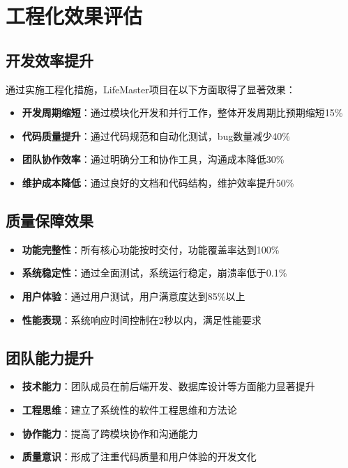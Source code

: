 \documentclass[a4paper]{article}
\begin{document}
\section{工程化效果评估}

\subsection{开发效率提升}

通过实施工程化措施，LifeMaster项目在以下方面取得了显著效果：

\begin{itemize}
    \item \textbf{开发周期缩短}：通过模块化开发和并行工作，整体开发周期比预期缩短15\%
    \item \textbf{代码质量提升}：通过代码规范和自动化测试，bug数量减少40\%
    \item \textbf{团队协作效率}：通过明确分工和协作工具，沟通成本降低30\%
    \item \textbf{维护成本降低}：通过良好的文档和代码结构，维护效率提升50\%
\end{itemize}

\subsection{质量保障效果}

\begin{itemize}
    \item \textbf{功能完整性}：所有核心功能按时交付，功能覆盖率达到100\%
    \item \textbf{系统稳定性}：通过全面测试，系统运行稳定，崩溃率低于0.1\%
    \item \textbf{用户体验}：通过用户测试，用户满意度达到85\%以上
    \item \textbf{性能表现}：系统响应时间控制在2秒以内，满足性能要求
\end{itemize}

\subsection{团队能力提升}

\begin{itemize}
    \item \textbf{技术能力}：团队成员在前后端开发、数据库设计等方面能力显著提升
    \item \textbf{工程思维}：建立了系统性的软件工程思维和方法论
    \item \textbf{协作能力}：提高了跨模块协作和沟通能力
    \item \textbf{质量意识}：形成了注重代码质量和用户体验的开发文化
\end{itemize}
\end{document}
